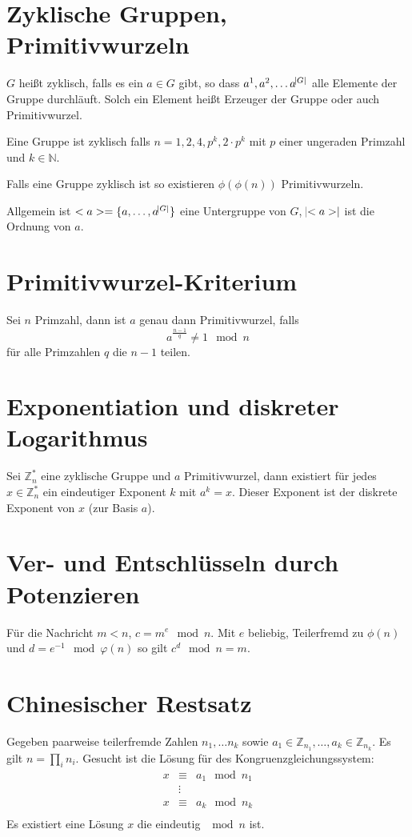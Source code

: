 \section{Zyklische Gruppen, Primitivwurzeln}
$G$ heißt zyklisch, falls es ein $a \in G$ gibt, so dass $a^1, a^2, \ldots a^{\abs{G}}$
alle Elemente der Gruppe durchläuft. Solch ein Element heißt Erzeuger der Gruppe
oder auch Primitivwurzel.

Eine Gruppe ist zyklisch falls $n = 1, 2, 4, p^k, 2\cdot p^k$ mit $p$ einer ungeraden
Primzahl und $k \in \mathbb{N}$.

Falls eine Gruppe zyklisch ist so existieren $\phi(\phi(n))$ Primitivwurzeln.

Allgemein ist $<a> = \{a, \ldots, a^{\abs{G}}\}$ eine Untergruppe von $G$, 
$\abs{<a>}$ ist die Ordnung von $a$.

\section{Primitivwurzel-Kriterium}
Sei $n$ Primzahl, dann ist $a$ genau dann Primitivwurzel, falls
\begin{equation}
    a^{\frac{n-1}{q}} \neq 1 \mod n
\end{equation}
für alle Primzahlen $q$ die $n-1$ teilen.

\section{Exponentiation und diskreter Logarithmus}
Sei $\mathbb{Z}_n^*$ eine zyklische Gruppe und $a$ Primitivwurzel, dann existiert
für jedes $x \in \mathbb{Z}_n^*$ ein eindeutiger Exponent $k$ mit $a^k = x$.
Dieser Exponent ist der diskrete Exponent von $x$ (zur Basis $a$).

\section{Ver- und Entschlüsseln durch Potenzieren}
Für die Nachricht $m < n$, $c=m^e \mod n$. Mit $e$ beliebig, Teilerfremd zu $\phi(n)$
und $d = e^{-1} \mod \varphi(n)$ so gilt $c^d \mod n = m$.

\section{Chinesischer Restsatz}
Gegeben paarweise teilerfremde Zahlen $n_1, \ldots n_k$ sowie $a_1 \in \mathbb{Z}_{n_1}, \ldots, a_k \in \mathbb{Z}_{n_k}$.
Es gilt $n=\prod_i n_i$.
Gesucht ist die Lösung für des Kongruenzgleichungssystem:
\begin{eqnarray}
    x &\equiv& a_1 \mod n_1 \\
    &\vdots& \\
    x &\equiv& a_k \mod n_k \\
\end{eqnarray}
Es existiert eine Lösung $x$ die eindeutig $\mod n$ ist.


